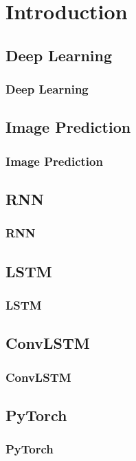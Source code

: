 \section{Introduction} 
 \subsection{Deep Learning}
  \begin{frame}
   \frametitle{Deep Learning}
   
  \end{frame}
 
 \subsection{Image Prediction}
  \begin{frame}
   \frametitle{Image Prediction}
   
  \end{frame}
 
 \subsection{RNN}
  \begin{frame}
   \frametitle{RNN}
   
  \end{frame}
 
 \subsection{LSTM}
  \begin{frame}
   \frametitle{LSTM}
   
  \end{frame}
 
 \subsection{ConvLSTM}
  \begin{frame}
   \frametitle{ConvLSTM}
   
  \end{frame}
 
 \subsection{PyTorch}
  \begin{frame}
   \frametitle{PyTorch}
   
  \end{frame} 
 